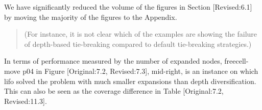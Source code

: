 \documentclass{article}
\begin{document}
We have significantly reduced the volume of the figures in Section
[Revised:6.1] by moving the majority of the figures to the Appendix.

\begin{quote}
(For
instance, it is not clear which of the examples are showing the
failure of depth-based tie-breaking compared to default tie-breaking
strategies.)
\end{quote}


In terms of performance measured by the number of expanded nodes,
freecell-move p04 in Figure [Original:7.2, Revised:7.3], mid-right,
is an instance on which lifo solved the problem
with much smaller expansions than depth diversification.
This can also be seen as the coverage difference in Table [Original:7.2, Revised:11.3].
\end{document}

